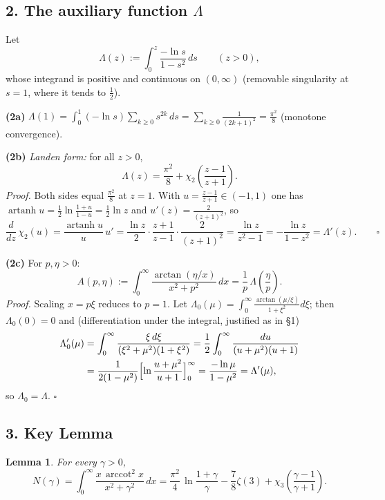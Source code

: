 \documentclass[11pt]{article}
\newtheorem{lemma}{Lemma}
\theoremstyle{remark}
\begin{document}
\subsection*{2. The auxiliary function $\Lambda$}

Let
\[\Lambda(z):=\int_0^z\frac{-\ln s}{1-s^2}\,ds\qquad(z>0),\]
whose integrand is positive and continuous on $(0,\infty)$ (removable singularity at $s=1$, where it tends to $\tfrac12$).

\textbf{(2a)} $\displaystyle\Lambda(1)=\int_0^1(-\ln s)\sum_{k\ge0}s^{2k}\,ds=\sum_{k\ge0}\frac1{(2k+1)^2}=\frac{\pi^2}{8}$ (monotone convergence).

\textbf{(2b)} \emph{Landen form:} for all $z>0$,
\begin{equation}
\Lambda(z)=\frac{\pi^2}{8}+\chi_2\!\left(\frac{z-1}{z+1}\right). \tag{2.1}
\end{equation}
\emph{Proof.} Both sides equal $\frac{\pi^2}{8}$ at $z=1$. With $u=\frac{z-1}{z+1}\in(-1,1)$ one has $\operatorname{artanh}u=\frac12\ln\frac{1+u}{1-u}=\frac12\ln z$ and $u'(z)=\frac{2}{(z+1)^2}$, so
\[\frac{d}{dz}\,\chi_2(u)=\frac{\operatorname{artanh}u}{u}\,u'
=\frac{\ln z}{2}\cdot\frac{z+1}{z-1}\cdot\frac{2}{(z+1)^2}
=\frac{\ln z}{z^2-1}=-\frac{\ln z}{1-z^2}=\Lambda'(z).\qquad\square\]

\textbf{(2c)} For $p,\eta>0$:
\begin{equation}
A(p,\eta):=\int_0^\infty\frac{\arctan(\eta/x)}{x^2+p^2}\,dx=\frac1p\,\Lambda\!\left(\frac{\eta}{p}\right). \tag{2.2}
\end{equation}
\emph{Proof.} Scaling $x=p\xi$ reduces to $p=1$. Let $\Lambda_0(\mu)=\int_0^\infty\frac{\arctan(\mu/\xi)}{1+\xi^2}d\xi$; then $\Lambda_0(0)=0$ and (differentiation under the integral, justified as in \S1)
\[\begin{aligned}
\Lambda_0'(\mu)&=\int_0^\infty\frac{\xi\,d\xi}{(\xi^2+\mu^2)(1+\xi^2)}
=\frac12\int_0^\infty\frac{du}{(u+\mu^2)(u+1)}\\
&=\frac{1}{2(1-\mu^2)}\Bigl[\ln\frac{u+\mu^2}{u+1}\Bigr]_0^\infty
=\frac{-\ln\mu}{1-\mu^2}=\Lambda'(\mu),
\end{aligned}\]
so $\Lambda_0=\Lambda$. $\square$

\subsection*{3. Key Lemma}

\begin{lemma}
For every $\gamma>0$,
\[N(\gamma)=\int_0^\infty\frac{x\,\operatorname{arccot}^2x}{x^2+\gamma^2}\,dx
=\frac{\pi^2}{4}\,\ln\frac{1+\gamma}{\gamma}-\frac78\zeta(3)+\chi_3\!\left(\frac{\gamma-1}{\gamma+1}\right).\]
\end{lemma}
\end{document}
